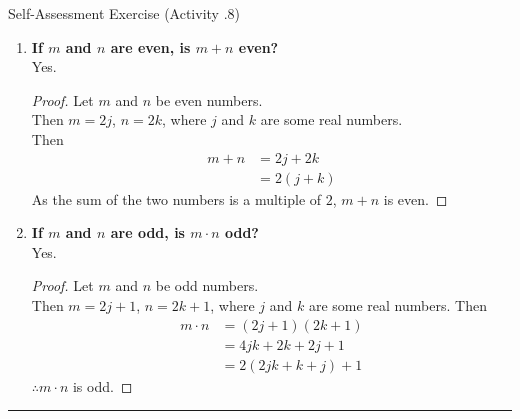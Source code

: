 \documentclass[../notes.tex]{subfiles}
\begin{document}
\begin{exercisebox}{Self-Assessment Exercise (Activity \thechapter.8)}
\begin{enumerate}
\begin{proof}
					\end{proof}
					\item \textbf{If $m$ and $n$ are even, is $m + n$ even?}\\
					Yes. \rule{0pt}{11pt} \vspace*{-18pt}
					\begin{proof}
						Let $m$ and $n$ be even numbers.\\
						Then $m = 2j$, $n = 2k$, where $j$ and $k$ are some real numbers.\\
						Then
						\begin{align*}
							m + n &= 2j + 2k\\
							&= 2(j + k)
						\end{align*}
						As the sum of the two numbers is a multiple of $2$, $m + n$ is even.
					\end{proof}
					\item \textbf{If $m$ and $n$ are odd, is $m \cdot n$ odd?}\\
					Yes. \rule{0pt}{11pt} \vspace*{-18pt}
					\begin{proof}
						Let $m$ and $n$ be odd numbers.\\
						Then $m = 2j + 1$, $n = 2k + 1$, where $j$ and $k$ are some real numbers.
						Then
						\begin{align*}
							m\cdot n &= (2j + 1)(2k + 1)\\
							&= 4jk + 2k + 2j + 1\\
							&= 2(2jk + k + j) + 1
						\end{align*}
						$\therefore m \cdot n$ is odd. 
					\end{proof}
				\end{enumerate}
			\end{exercisebox}
			\noindent\rule{\textwidth}{0.4pt}
\end{document}
